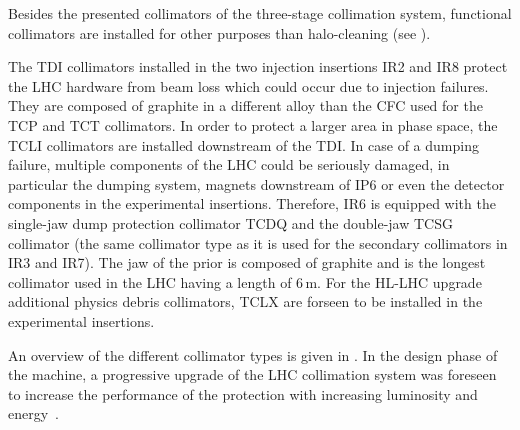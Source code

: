 Besides the presented collimators of the three-stage collimation system, functional collimators are installed for other purposes than halo-cleaning (see ). 

The TDI collimators installed in the two injection insertions IR2 and IR8 protect the LHC hardware from beam loss which could occur due to injection failures. They are composed of graphite in a different alloy than the CFC used for the TCP and TCT collimators. In order to protect a larger area in phase space, the TCLI collimators are installed downstream of the TDI. In case of a dumping failure, multiple components of the LHC could be seriously damaged, in particular the dumping system, magnets downstream of IP6 or even the detector components in the experimental insertions. Therefore, IR6 is equipped with the single-jaw dump protection collimator TCDQ and the double-jaw TCSG collimator (the same collimator type as it is used for the secondary collimators in IR3 and IR7). The jaw of the prior is composed of graphite and is the longest collimator used in the LHC having a length of 6$\,$m. 
For the HL-LHC upgrade additional physics debris collimators, TCLX are forseen to be installed in the experimental insertions. 


An overview of the different collimator types is given in . In the design phase of the machine, a progressive upgrade of the LHC collimation system was foreseen to increase the performance of the protection with increasing luminosity and energy~\citedr. 



